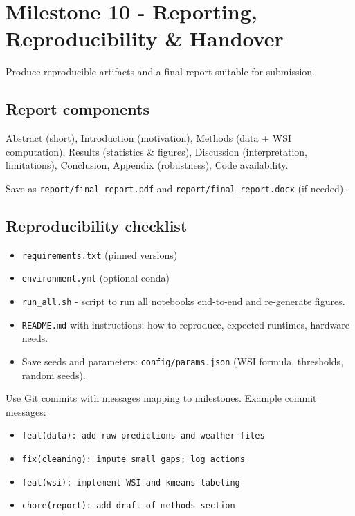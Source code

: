 \documentclass[11pt,a4paper]{article}
\begin{document}
\section{Milestone 10 - Reporting, Reproducibility \& Handover}

\begin{objectivebox}
Produce reproducible artifacts and a final report suitable for submission.
\end{objectivebox}

\subsection{Report components}
Abstract (short), Introduction (motivation), Methods (data + WSI computation), Results (statistics \& figures), Discussion (interpretation, limitations), Conclusion, Appendix (robustness), Code availability.

Save as \texttt{report/final\_report.pdf} and \texttt{report/final\_report.docx} (if needed).

\subsection{Reproducibility checklist}
\begin{itemize}
    \item \texttt{requirements.txt} (pinned versions)
    \item \texttt{environment.yml} (optional conda)
    \item \texttt{run\_all.sh} - script to run all notebooks end-to-end and re-generate figures.
    \item \texttt{README.md} with instructions: how to reproduce, expected runtimes, hardware needs.
    \item Save seeds and parameters: \texttt{config/params.json} (WSI formula, thresholds, random seeds).
\end{itemize}

Use Git commits with messages mapping to milestones. Example commit messages:
\begin{itemize}
    \item \texttt{feat(data): add raw predictions and weather files}
    \item \texttt{fix(cleaning): impute small gaps; log actions}
    \item \texttt{feat(wsi): implement WSI and kmeans labeling}
    \item \texttt{chore(report): add draft of methods section}
\end{itemize}
\end{document}
